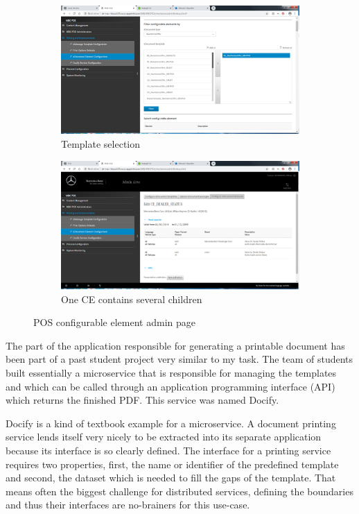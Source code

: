\begin{figure}
  \centering
  \begin{subfigure}[b]{0.5\linewidth}
    \includegraphics[width=\linewidth]{assets/pos-ce-config-1.png}
    \caption{Template selection}
  \end{subfigure}
  \begin{subfigure}[b]{0.5\linewidth}
    \includegraphics[width=\linewidth]{assets/pos-ce-config-3.png}
    \caption{One CE contains several children}
  \end{subfigure}
  \caption{POS configurable element admin page}
  \label{fig:pos}
\end{figure}

The part of the application responsible for generating a printable document has been part of a past student project very similar to my task. The team of students built essentially a microservice that is responsible for managing the templates and which can be called through an application programming interface (API) which returns the finished PDF. This service was named Docify.

Docify is a kind of textbook example for a microservice. A document printing service lends itself very nicely to be extracted into its separate application because its interface is so clearly defined. The interface for a printing service requires two properties, first, the name or identifier of the predefined template and second, the dataset which is needed to fill the gaps of the template. That means often the biggest challenge for distributed services, defining the boundaries and thus their interfaces are no-brainers for this use-case.

